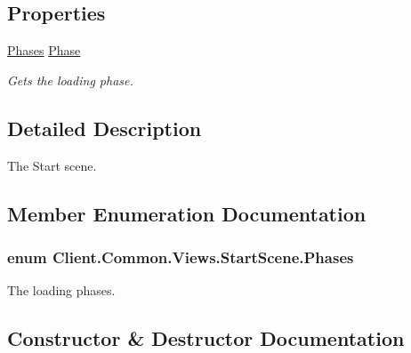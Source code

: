 \subsection*{Properties}
\begin{DoxyCompactItemize}
\item 
\hyperlink{classClient_1_1Common_1_1Views_1_1StartScene_a5ac44ab2a6140aa7283255095f8503f2}{Phases} \hyperlink{classClient_1_1Common_1_1Views_1_1StartScene_abdd3214f601d66c9f235ff70ec097210}{Phase}
\begin{DoxyCompactList}\small\item\em Gets the loading phase. \end{DoxyCompactList}\end{DoxyCompactItemize}


\subsection{Detailed Description}
The Start scene. 



\subsection{Member Enumeration Documentation}
\hypertarget{classClient_1_1Common_1_1Views_1_1StartScene_a5ac44ab2a6140aa7283255095f8503f2}{}
\subsubsection[{Phases}]{\setlength{\rightskip}{0pt plus 5cm}enum {\bf Client.\+Common.\+Views.\+Start\+Scene.\+Phases}\hspace{0.3cm}{\ttfamily [strong]}}\label{classClient_1_1Common_1_1Views_1_1StartScene_a5ac44ab2a6140aa7283255095f8503f2}


The loading phases. 



\subsection{Constructor \& Destructor Documentation}
\hypertarget{classClient_1_1Common_1_1Views_1_1StartScene_a9bb2c1aec787e16d9d2b4f6de0cc15fc}{}
